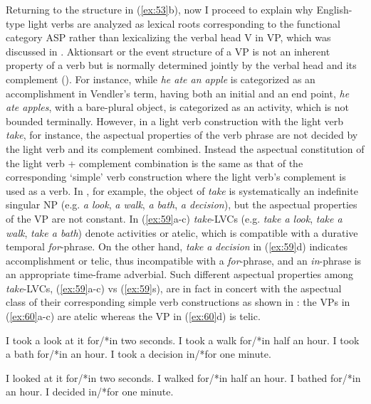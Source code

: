 Returning to the structure in (\ref{ex:53}b), now I proceed to explain why English-type light verbs are analyzed as lexical roots corresponding to the functional category \ac{ASP} rather than lexicalizing the verbal head V in \ac{VP}, which was discussed in \citet{DenDikkenShim2011}. Aktionsart or the event structure of a \ac{VP} is not an inherent property of a verb but is normally determined jointly by the verbal head and its complement (\citealt{Dowty1979,Tenny1994,VanVoorst1988,Verkuyl1972,Verkuyl1993}). For instance, while \textit{he ate an apple} is categorized as an accomplishment in Vendler’s term, having both an initial and an end point, \textit{he ate apples}, with a bare-plural object, is categorized as an activity, which is not bounded terminally. However, in a light verb construction with the light verb \textit{take}, for instance, the aspectual properties of the verb phrase are not decided by the light verb and its complement combined. Instead the aspectual constitution of the light verb + complement combination is the same as that of the corresponding ‘simple’ verb construction where the light verb’s complement is used as a verb. In , for example, the object of \textit{take} is systematically an indefinite singular \ac{NP} (e.g. \textit{a look}, \textit{a walk}, \textit{a bath}, \textit{a decision}), but the aspectual properties of the \ac{VP} are not constant. In (\ref{ex:59}a-c) \textit{take}-\acp{LVC} (e.g. \textit{take a look}, \textit{take a walk}, \textit{take a bath}) denote activities or atelic, which is compatible with a durative temporal \textit{for}{}-phrase. On the other hand, \textit{take} \textit{a} \textit{decision} in (\ref{ex:59}d) indicates accomplishment or telic, thus incompatible with a \textit{for}-phrase, and an \textit{in}-phrase is an appropriate time-frame adverbial. Such different aspectual properties among \textit{take}-\acp{LVC}, (\ref{ex:59}a-c) vs (\ref{ex:59}s), are in fact in concert with the aspectual class of their corresponding simple verb constructions as shown in : the \ac{VP}s in (\ref{ex:60}a-c) are atelic whereas the \ac{VP} in (\ref{ex:60}d) is telic. 
  
\ea\label{ex:59} 
    \ea I took a look at it for/*in two seconds.
    \ex I took a walk for/*in half an hour.
    \ex I took a bath for/*in an hour.
    \ex I took a decision in/*for one minute.
    \z

\ex \label{ex:60}
    \ea  I looked at it for/*in two seconds.
    \ex I walked for/*in half an hour.
    \ex I bathed for/*in an hour.
    \ex I decided in/*for one minute.
    \z
\z

